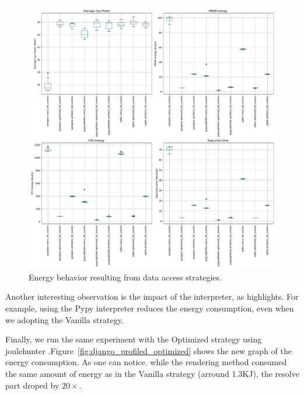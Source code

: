 \begin{figure}[!hbt]
    \centering
    \includegraphics[width=\linewidth]{imgs/django}
    \caption{Energy behavior resulting from data access strategies.}
    \label{fig:django}
\end{figure}

Another interesting observation is the impact of the interpreter, as  highlights.
For example, using the \textsf{Pypy} interpreter reduces the energy consumption, even when we adopting the \textsf{Vanilla} strategy.

Finally, we run the same experiment with the \textsf{Optimized} strategy
using joulehunter
.Figure~\ref{fig:django_profiled_optimized} shows the new graph of the energy consumption. As one can notice. while the rendering method consumed the same amount of energy as in  the \textsf{Vanilla} strategy (arround 1.3KJ), the resolve part droped by $20\times$.

